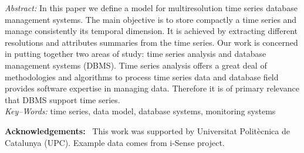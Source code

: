 \documentclass[twocolumn,11pt,a4paper]{article}
\begin{document}
{\begin{minipage}[b]{6.9in}
\baselineskip 12.5pt {\it Abstract:}
In this paper we define a model for multiresolution time series
database management systems. The main objective is to store compactly
a time series and manage consistently its temporal dimension. It is
achieved by extracting different resolutions and attributes summaries
from the time series.  
%
Our work is concerned in putting together two areas of study: time
series analysis and database management systems (DBMS). Time series analysis
offers a great deal of methodologies and algorithms to process time
series data and database field provides software expertise in managing
data. Therefore it is of primary relevance that DBMS support time series.
%
\\ [4mm] {\it Key--Words:}
time series, data model, database systems, monitoring systems
\end{minipage}
\vspace{-10pt}}

\maketitle

\thispagestyle{empty} \pagestyle{empty}
%
%















\vspace{10pt} \noindent
{\bf Acknowledgements:} \ This work was supported by Universitat Polit\`{e}cnica de Catalunya (UPC). Example data comes from i-Sense project.


\printbibliography{}



\end{document}
